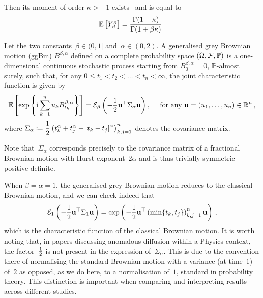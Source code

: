 Then its moment of order $\kappa>-1$ exists~\cite{Piryatinska2005ModelsCase} and is equal to
\begin{equation}\label{eq:MWrightMom}
\mathbb{E} \left[Y_\beta^\kappa\right]
 = \frac{\Gamma(1+\kappa)}{\Gamma(1+\beta \kappa)}\,.
\end{equation}
\begin{definition}\label{def:ggBm}
Let the two constants~${\beta\in(0,1]}$ and~${\alpha\in(0,2)}$. 
A generalised grey Brownian motion (ggBm) $B^{\beta, \alpha}$ defined on a complete probability space $(\Omega, \mathcal{F}, \mathbb{P})$ is a one-dimensional continuous stochastic process  
starting from 
$B^{\beta, \alpha}_0 = 0$, $\mathbb{P}$-almost surely,
such that, for any $0 \leq t_1<t_2<\ldots<t_n<\infty$, the joint characteristic function is given by
$$
    \mathbb{E}\left[\exp\left\{{\mathrm{i}\mkern1mu} \sum_{k=1}^n u_k B^{\beta, \alpha}_{t_k}\right\}\right]
    = \mathcal{E}_{\beta}\left(-\frac{1}{2}\boldsymbol{\mathrm{u}}^\top\Sigma_\alpha \boldsymbol{\mathrm{u}}\right),
    \quad \text{ for any }\boldsymbol{\mathrm{u}}=(u_1, \ldots, u_n) \in\mathbb{R}^n\,,
$$
    where
    $\displaystyle \Sigma_\alpha \coloneqq \frac{1}{2}\left(t_k^\alpha+t_j^\alpha-\left|t_k-t_j\right|^\alpha\right)_{k, j=1}^n$ denotes the covariance matrix.
\end{definition}
Note that~$\Sigma_\alpha$ corresponds precisely to the covariance matrix of a fractional Brownian motion with Hurst exponent~$2\alpha$ and is thus trivially symmetric positive definite.
\begin{remark}
When $\beta=\alpha=1$, the generalised grey Brownian motion reduces to the classical Brownian motion, and we can check indeed that
\[
\mathcal{E}_{1}\left(-\frac{1}{2}\boldsymbol{\mathrm{u}}^\top\Sigma_1 \boldsymbol{\mathrm{u}}\right) = \exp\left(- \frac{1}{2}\boldsymbol{\mathrm{u}}^\top \left(\min\{t_k, t_j\}\right)_{k,j=1}^n \boldsymbol{\mathrm{u}}\right)\,,
\]
which is the characteristic function of the classical Brownian motion. 
It is worth noting that, in papers discussing anomalous diffusion within a Physics context, the factor~$\frac{1}{2}$ is not present in the expression of~$\Sigma_{\alpha}$. This is due to the convention there of normalising the standard Brownian motion with a variance (at time~$1$) of~$2$ as opposed, as we do here, to a normalisation of~$1$, standard in probability theory. 
This distinction is important when comparing and interpreting results across different studies.
\end{remark}

